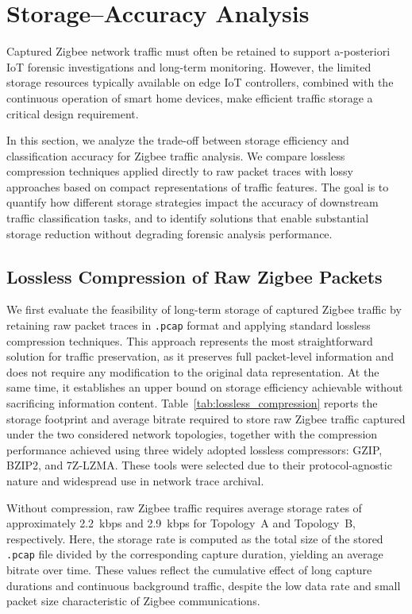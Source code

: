 \section{Storage--Accuracy Analysis}
\label{sec:compression}
Captured Zigbee network traffic must often be retained to support a-posteriori IoT forensic investigations and long-term monitoring. However, the limited storage resources typically available on edge IoT controllers, combined with the continuous operation of smart home devices, make efficient traffic storage a critical design requirement.

In this section, we analyze the trade-off between storage efficiency and classification accuracy for Zigbee traffic analysis. We compare lossless compression techniques applied directly to raw packet traces with lossy approaches based on compact representations of traffic features. The goal is to quantify how different storage strategies impact the accuracy of downstream traffic classification tasks, and to identify solutions that enable substantial storage reduction without degrading forensic analysis performance.


\subsection{Lossless Compression of Raw Zigbee Packets}
We first evaluate the feasibility of long-term storage of captured Zigbee traffic by retaining raw packet traces in \texttt{.pcap} format and applying standard lossless compression techniques. This approach represents the most straightforward solution for traffic preservation, as it preserves full packet-level information and does not require any modification to the original data representation. At the same time, it establishes an upper bound on storage efficiency achievable without sacrificing information content.
%
Table~\ref{tab:lossless_compression} reports the storage footprint and average bitrate required to store raw Zigbee traffic captured under the two considered network topologies, together with the compression performance achieved using three widely adopted lossless compressors: GZIP, BZIP2, and 7Z-LZMA. These tools were selected due to their protocol-agnostic nature and widespread use in network trace archival.

Without compression, raw Zigbee traffic requires average storage rates of approximately 2.2~kbps and 2.9~kbps for Topology~A and Topology~B, respectively. Here, the storage rate is computed as the total size of the stored \texttt{.pcap} file divided by the corresponding capture duration, yielding an average bitrate over time. These values reflect the cumulative effect of long capture durations and continuous background traffic, despite the low data rate and small packet size characteristic of Zigbee communications.

